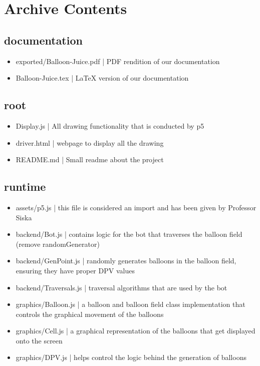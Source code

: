 \documentclass{article}
\begin{document}
\newpage

\section{Archive Contents}

\subsection{documentation}
\begin{itemize}
\item exported/Balloon-Juice.pdf | PDF rendition of our documentation
\item Balloon-Juice.tex | LaTeX version of our documentation
\end{itemize}

\subsection{root}

\begin{itemize}
\item Display.js | All drawing functionality that is conducted by p5
\item driver.html | webpage to display all the drawing
\item README.md | Small readme about the project
\end{itemize}

\subsection{runtime}

\begin{itemize}
\item assets/p5.js | this file is considered an import and has been given by Professor Siska
\item backend/Bot.js | contains logic for the bot that traverses the balloon field (remove randomGenerator)
\item backend/GenPoint.js | randomly generates balloons in the balloon field, ensuring they have proper DPV values
\item backend/Traversals.js | traversal algorithms that are used by the bot
\item graphics/Balloon.js | a balloon and balloon field class implementation that controls the graphical movement of the balloons
\item graphics/Cell.js | a graphical representation of the balloons that get displayed onto the screen
\item graphics/DPV.js | helps control the logic behind the generation of balloons
\end{itemize}
\end{document}
